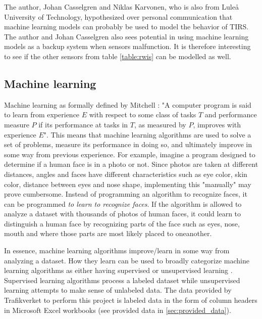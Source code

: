 	The author, Johan Casselgren and Niklas Karvonen, who is also from Luleå University of Technology, hypothesized over personal communication that machine learning models can probably be used to model the behavior of TIRS. The author and Johan Casselgren also sees potential in using machine learning models as a backup system when sensors malfunction. It is therefore interesting to see if the other sensors from table \ref{table:rwis} can be modelled as well. 



	\subsection{Machine learning} \label{sec:machinelearning}
	Machine learning as formally defined by Mitchell \cite{BOOK:2}: 
"A computer program is said to learn from experience $E$ with respect to some class of tasks $T$ and performance measure $P$ if its performance at tasks in $T$, as measured by $P$, improves with experience $E$". This means that machine learning algorithms are used to solve a set of problems, measure its performance in doing so, and ultimately improve in some way from previous experience. For example, imagine a program designed to determine if a human face is in a photo or not. Since photos are taken at different distances, angles and faces have different characteristics such as eye color, skin color, distance between eyes and nose shape, implementing this "manually" may prove cumbersome. Instead of programming an algorithm to recognize faces, it can be programmed  \emph{to learn to recognize faces}. If the algorithm is allowed to analyze a dataset with thousands of photos of human faces, it could learn to distinguish a human face by recognizing parts of the face such as eyes, nose, mouth and where those parts are most likely placed to oneanother.

	In essence, machine learning algorithms improve/learn in some way from analyzing a dataset. How they learn can be used to broadly categorize machine learning algorithms as either having supervised or unsupervised learning \cite{BOOK:1}. Supervised learning algorithms process a labeled dataset while unsupervised learning attempts to make sense of unlabeled data. The data provided by Trafikverket to perform this project is labeled data in the form of column headers in Microsoft Excel workbooks (see provided data in \ref{sec:provided_data}). 

